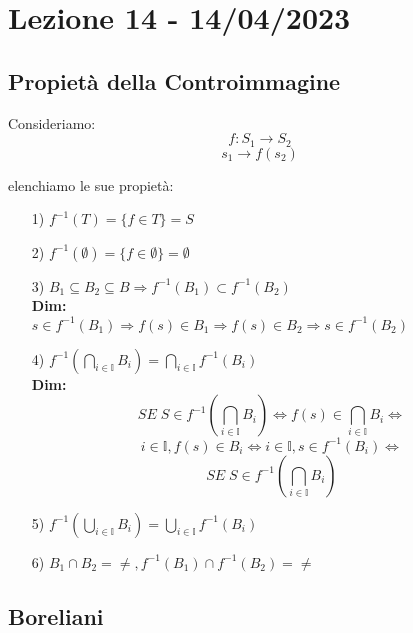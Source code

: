 \section{Lezione 14 - 14/04/2023}

\subsection{Propietà della Controimmagine}
Consideriamo:
$$ f: S_1 \rightarrow S_2$$
$$s_1\rightarrow f(s_2)$$

elenchiamo le sue propietà:
\begin{itemize}
\item[1)] $f^{-1}(T) = \{f \in T\} = S$
\item[2)] $f^{-1}(\emptyset) = \{f \in \emptyset\} = \emptyset$
\item[3)] $B_1 \subseteq B_2 \subseteq B \Rightarrow f^{-1}(B_1) \subset  f^{-1}(B_2)$\\
\textbf{Dim:}\\
$s \in f^{-1}(B_1) \Rightarrow f(s) \in B_1 \Rightarrow f(s) \in B_2 \Rightarrow s \in f^{-1}(B_2)$
\item[4)] $f^{-1}(\bigcap_{i \in \mathbb{I}} B_i) = \bigcap_{i \in \mathbb{I}} f^{-1}(B_i)$\\
\textbf{Dim:}
$$ SE \; S \in f^{-1}(\bigcap_{i \in \mathbb{I}} B_i) \Leftrightarrow f(s) \in \bigcap_{i \in \mathbb{I}} B_i \Leftrightarrow$$
$$ i \in \mathbb{I}, f(s) \in B_i \Leftrightarrow i \in \mathbb{I}, s \in f^{-1}(B_i) \Leftrightarrow$$
$$ SE \; S \in f^{-1}(\bigcap_{i \in \mathbb{I}} B_i)$$
\item[5)] $f^{-1}(\bigcup_{i \in \mathbb{I}} B_i) = \bigcup_{i \in \mathbb{I}} f^{-1}(B_i)$\\
\item[6)] $B_1 \cap B_2 = \neq, f^{-1}(B_1) \cap f^{-1}(B_2) = \neq $ 
\end{itemize}

\subsection{Boreliani}